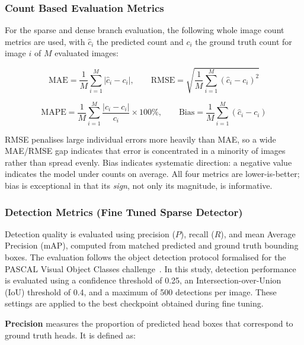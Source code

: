 \subsubsection{Count Based Evaluation Metrics}

For the sparse and dense branch evaluation, the following whole image count metrics are used, with $\hat c_i$ the predicted count and $c_i$ the ground truth count for image $i$ of $M$ evaluated images:

\begin{equation}
	\text{MAE} = \frac{1}{M}\sum_{i=1}^{M} \left| \hat{c}_i - c_i \right|, \qquad
	\text{RMSE} = \sqrt{ \frac{1}{M}\sum_{i=1}^{M} \left( \hat{c}_i - c_i \right)^2 }
\end{equation}

\begin{equation}
	\text{MAPE} = \frac{1}{M}\sum_{i=1}^{M} \frac{\left| \hat{c}_i - c_i \right|}{c_i} \times 100\%, \qquad
	\text{Bias} = \frac{1}{M}\sum_{i=1}^{M} \left( \hat{c}_i - c_i \right)
\end{equation}

RMSE penalises large individual errors more heavily than MAE, so a wide MAE/RMSE gap indicates that error is concentrated in a minority of images rather than spread evenly. Bias indicates systematic direction: a negative value indicates the model under counts on average. All four metrics are lower-is-better; bias is exceptional in that its \emph{sign}, not only its magnitude, is informative.

\subsubsection{Detection Metrics (Fine Tuned Sparse Detector)}

Detection quality is evaluated using precision ($P$), recall ($R$), and mean Average Precision (mAP), computed from matched predicted and ground truth bounding boxes. The evaluation follows the object detection protocol formalised for the PASCAL Visual Object Classes challenge~\cite{everingham2010voc}. In this study, detection performance is evaluated using a confidence threshold of 0.25, an Intersection-over-Union (IoU) threshold of 0.4, and a maximum of 500 detections per image. These settings are applied to the best checkpoint obtained during fine tuning.

\textbf{Precision} measures the proportion of predicted head boxes that correspond to ground truth heads. It is defined as:

